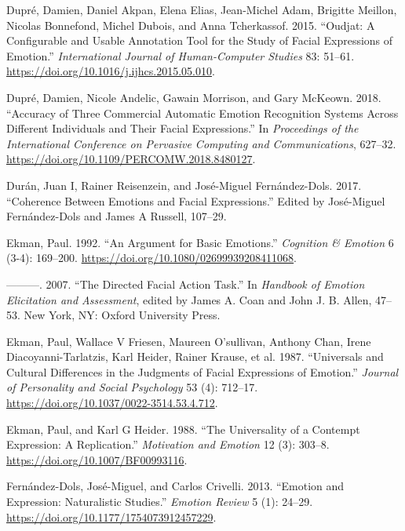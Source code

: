 \documentclass[conference,final,]{IEEEtran}
\begin{document}
\leavevmode\hypertarget{ref-dupre2015oudjat}{}%
Dupré, Damien, Daniel Akpan, Elena Elias, Jean-Michel Adam, Brigitte
Meillon, Nicolas Bonnefond, Michel Dubois, and Anna Tcherkassof. 2015.
``Oudjat: A Configurable and Usable Annotation Tool for the Study of
Facial Expressions of Emotion.'' \emph{International Journal of
Human-Computer Studies} 83: 51--61.
\url{https://doi.org/10.1016/j.ijhcs.2015.05.010}.

\leavevmode\hypertarget{ref-dupre2018accuracy}{}%
Dupré, Damien, Nicole Andelic, Gawain Morrison, and Gary McKeown. 2018.
``Accuracy of Three Commercial Automatic Emotion Recognition Systems
Across Different Individuals and Their Facial Expressions.'' In
\emph{Proceedings of the International Conference on Pervasive Computing
and Communications}, 627--32.
\url{https://doi.org/10.1109/PERCOMW.2018.8480127}.

\leavevmode\hypertarget{ref-duran2017coherence}{}%
Durán, Juan I, Rainer Reisenzein, and José-Miguel Fernández-Dols. 2017.
``Coherence Between Emotions and Facial Expressions.'' Edited by
José-Miguel Fernández-Dols and James A Russell, 107--29.

\leavevmode\hypertarget{ref-ekman1992argument}{}%
Ekman, Paul. 1992. ``An Argument for Basic Emotions.'' \emph{Cognition
\& Emotion} 6 (3-4): 169--200.
\url{https://doi.org/10.1080/02699939208411068}.

\leavevmode\hypertarget{ref-ekman2007directed}{}%
---------. 2007. ``The Directed Facial Action Task.'' In \emph{Handbook
of Emotion Elicitation and Assessment}, edited by James A. Coan and John
J. B. Allen, 47--53. New York, NY: Oxford University Press.

\leavevmode\hypertarget{ref-ekman1987universals}{}%
Ekman, Paul, Wallace V Friesen, Maureen O'sullivan, Anthony Chan, Irene
Diacoyanni-Tarlatzis, Karl Heider, Rainer Krause, et al. 1987.
``Universals and Cultural Differences in the Judgments of Facial
Expressions of Emotion.'' \emph{Journal of Personality and Social
Psychology} 53 (4): 712--17.
\url{https://doi.org/10.1037/0022-3514.53.4.712}.

\leavevmode\hypertarget{ref-ekman1988universality}{}%
Ekman, Paul, and Karl G Heider. 1988. ``The Universality of a Contempt
Expression: A Replication.'' \emph{Motivation and Emotion} 12 (3):
303--8. \url{https://doi.org/10.1007/BF00993116}.

\leavevmode\hypertarget{ref-fernandez2013emotion}{}%
Fernández-Dols, José-Miguel, and Carlos Crivelli. 2013. ``Emotion and
Expression: Naturalistic Studies.'' \emph{Emotion Review} 5 (1): 24--29.
\url{https://doi.org/10.1177/1754073912457229}.
\end{document}
